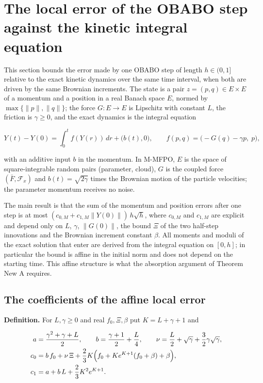 \documentclass[11pt,a4paper]{report}
\begin{document}
\section{\texorpdfstring{The local error of the OBABO step against the kinetic integral equation}{The local error of the OBABO step against the kinetic integral equation}}


This section bounds the error made by one OBABO step of length \(h\in(0,1]\) relative to the exact kinetic dynamics over the same time interval, when both are driven by the same Brownian increments. The state is a pair \(z=(p,q)\in E\times E\) of a momentum and a position in a real Banach space \(E\), normed by \(\max\{\|p\|,\|q\|\}\); the force \(G:E\to E\) is Lipschitz with constant \(L\), the friction is \(\gamma\ge0\), and the exact dynamics is the integral equation


\[Y(t)-Y(0)=\int_0^tf(Y(r))\,dr+\bigl(b(t),0\bigr),\qquad f(p,q)=\bigl(-G(q)-\gamma p,\;p\bigr),\]


with an additive input \(b\) in the momentum. In M-MFPO, \(E\) is the space of square-integrable random pairs (parameter, cloud), \(G\) is the coupled force \((\bar F,\mathcal F_x)\) and \(b(t)=\sqrt{2\gamma}\) times the Brownian motion of the particle velocities; the parameter momentum receives no noise.




The main result is that the sum of the momentum and position errors after one step is at most \((c_{0,M}+c_{1,M}\|Y(0)\|)\,h\sqrt h\), where \(c_{0,M}\) and \(c_{1,M}\) are explicit and depend only on \(L\), \(\gamma\), \(\|G(0)\|\), the bound \(\Xi\) of the two half-step innovations and the Brownian increment constant \(\beta\). All moments and moduli of the exact solution that enter are derived from the integral equation on \([0,h]\); in particular the bound is affine in the initial norm and does not depend on the starting time. This affine structure is what the absorption argument of Theorem New A requires.

\subsection{\texorpdfstring{The coefficients of the affine local error}{The coefficients of the affine local error}}


\textbf{Definition.} For \(L,\gamma\ge0\) and real \(f_0,\Xi,\beta\) put \(K=L+\gamma+1\) and


\[\begin{aligned}a&=\frac{\gamma^2+\gamma+L}{2},\qquad b=\frac{\gamma+1}{2}+\frac L4,\qquad \nu=\frac L2+\sqrt\gamma+\frac32\gamma\sqrt\gamma,\\ c_0&=b\,f_0+\nu\,\Xi+\frac23K\Bigl(f_0+Ke^{K+1}(f_0+\beta)+\beta\Bigr),\\ c_1&=a+b\,L+\frac23K^2e^{K+1}.\end{aligned}\]
\end{document}
